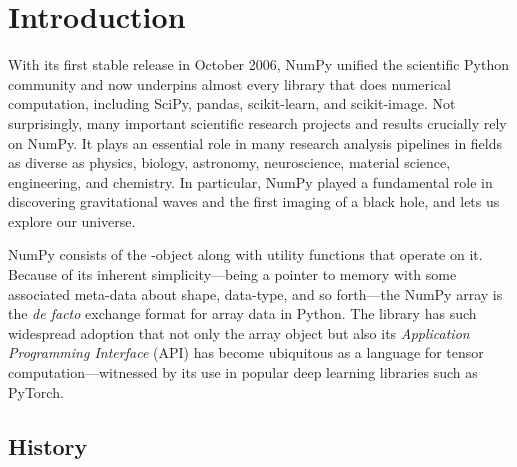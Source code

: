 \section{Introduction}

With its first stable release in October 2006, NumPy unified
the scientific Python community and now underpins almost every library
that does numerical computation, including SciPy\cite{virtanen2019scipy},
pandas\cite{mckinney-proc-scipy-2010}, scikit-learn\cite{pedregosa2011scikit},
and scikit-image\cite{vanderwalt2014scikit}.
Not surprisingly, many important scientific research projects and
results crucially rely on NumPy.
It plays an essential role in many research analysis pipelines in
fields as diverse as physics, biology, astronomy, neuroscience,
material science, engineering, and chemistry.
In particular, NumPy played a fundamental role in discovering
gravitational waves\cite{pycbc} and the first imaging of a black
hole\cite{eht-imaging}, and lets us explore our
universe\cite{jenness2018lsst}.


NumPy consists of the -object along with utility functions that
operate on it.
Because of its inherent simplicity—being a pointer to memory with some
associated meta-data about shape, data-type, and so forth—the NumPy array is
the {\it de facto} exchange format for array data in Python.
The library has such widespread adoption that not only the array object but also its
{\it Application Programming Interface} (API) has become ubiquitous as
a language for tensor computation---witnessed by its use in popular
deep learning libraries such as PyTorch\cite{pytorch}.

\subsection{History}

